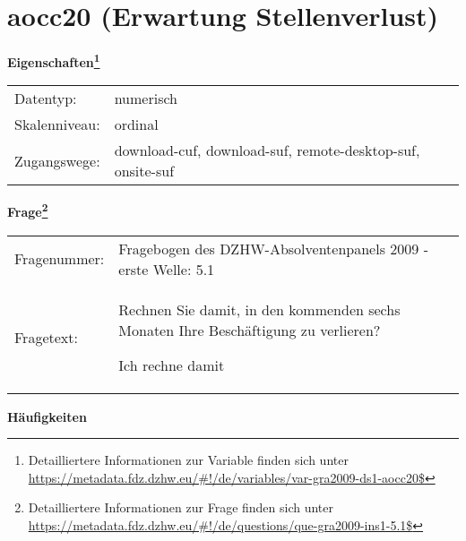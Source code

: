 
    \setcounter{footnote}{0}

    \vspace*{-1.8cm}
	\section{aocc20 (Erwartung Stellenverlust)}
	\label{section:aocc20}



    \vspace*{0.5cm}
    \noindent\textbf{Eigenschaften\footnote{Detailliertere Informationen zur Variable finden sich unter
		\url{https://metadata.fdz.dzhw.eu/\#!/de/variables/var-gra2009-ds1-aocc20$}}}\\
	\begin{tabularx}{\hsize}{@{}lX}
	Datentyp: & numerisch \\
	Skalenniveau: & ordinal \\
	Zugangswege: &
	  download-cuf, 
	  download-suf, 
	  remote-desktop-suf, 
	  onsite-suf
 \\
    \end{tabularx}



				\vspace*{0.5cm}
                \noindent\textbf{Frage\footnote{Detailliertere Informationen zur Frage finden sich unter
		              \url{https://metadata.fdz.dzhw.eu/\#!/de/questions/que-gra2009-ins1-5.1$}}}\\
				\begin{tabularx}{\hsize}{@{}lX}
					Fragenummer: &
					  Fragebogen des DZHW-Absolventenpanels 2009 - erste Welle:
					  5.1
 \\
					Fragetext: & Rechnen Sie damit, in den kommenden sechs Monaten Ihre Beschäftigung zu verlieren?\par  Ich rechne damit \\
				\end{tabularx}





        		\vspace*{0.5cm}
                \noindent\textbf{Häufigkeiten}

